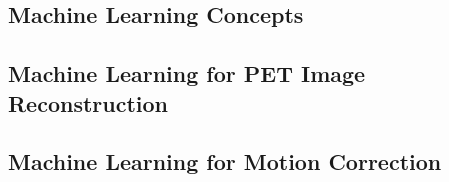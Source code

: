         \blindtext
        
        \subsection{Machine Learning Concepts} \label{machine_learning_concepts}
            \blindtext
        
        \subsection{Machine Learning for PET Image Reconstruction} \label{machine_learning_for_pet_image_reconstruction}
            \blindtext
        
        \subsection{Machine Learning for Motion Correction} \label{machine_learning_for_motion_correction}
            \blindtext
